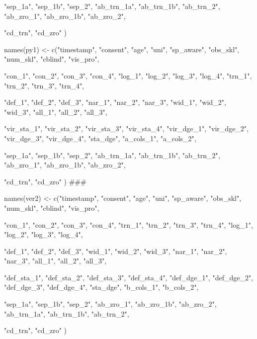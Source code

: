 \documentclass{article}
\begin{document}
                 "sep_1a", "sep_1b", "sep_2",
                 "ab_trn_1a", "ab_trn_1b", "ab_trn_2", 
                 "ab_zro_1", "ab_zro_1b", "ab_zro_2",
  
                 "cd_trn",
                 "cd_zro"
                 )

names(py1) <- c("timestamp", "consent", "age", "uni", "sp_aware", "obs_skl", "num_skl", "cblind", "vis_pro",
                 
                 "con_1", "con_2", "con_3", "con_4", 
                 "log_1", "log_2", "log_3", "log_4",
                 "trn_1", "trn_2", "trn_3", "trn_4",
  
                 "def_1", "def_2", "def_3", 
                 "nar_1", "nar_2", "nar_3", 
                 "wid_1", "wid_2", "wid_3",
                 "all_1", "all_2", "all_3",
  
                 "vir_sta_1", "vir_sta_2", "vir_sta_3", "vir_sta_4", 
                 "vir_dge_1", "vir_dge_2", "vir_dge_3", "vir_dge_4",
                 "sta_dge",
                 "a_cols_1", "a_cols_2", 
  
                 "sep_1a", "sep_1b", "sep_2",
                 "ab_trn_1a", "ab_trn_1b", "ab_trn_2", 
                 "ab_zro_1", "ab_zro_1b", "ab_zro_2",
  
                 "cd_trn",
                 "cd_zro"
                 )
###

names(ver2) <- c("timestamp", "consent", "age", "uni", "sp_aware", "obs_skl", "num_skl", "cblind", "vis_pro",
                 
                 "con_1", "con_2", "con_3", "con_4", 
                 "trn_1", "trn_2", "trn_3", "trn_4",
                 "log_1", "log_2", "log_3", "log_4",
                 
                 "def_1", "def_2", "def_3", 
                 "wid_1", "wid_2", "wid_3",
                 "nar_1", "nar_2", "nar_3", 
                 "all_1", "all_2", "all_3",
                 
                 "def_sta_1", "def_sta_2", "def_sta_3", "def_sta_4", 
                 "def_dge_1", "def_dge_2", "def_dge_3", "def_dge_4",
                 "sta_dge",
                 "b_cols_1", "b_cols_2", 
  
                 "sep_1a", "sep_1b", "sep_2",
                 "ab_zro_1", "ab_zro_1b", "ab_zro_2",
                 "ab_trn_1a", "ab_trn_1b", "ab_trn_2", 
  
                 "cd_trn",
                 "cd_zro"
                 )
\end{document}
